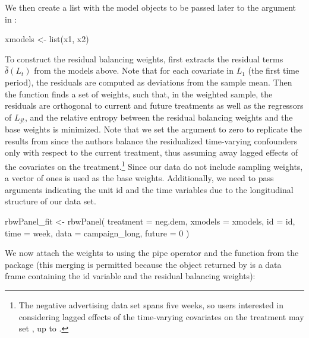 We then create a list with the model objects to be passed later to the
 argument in :

\begin{Schunk}
\begin{Sinput}
xmodels <- list(x1, x2)
\end{Sinput}
\end{Schunk}

To construct the residual balancing weights,  first
extracts the residual terms \(\hat{\delta}(L_{t})\) from the models
above. Note that for each covariate in \(L_{1}\) (the first time
period), the residuals are computed as deviations from the sample mean.
Then the function finds a set of weights, such that, in the weighted
sample, the residuals are orthogonal to current and future treatments as
well as the regressors of \(L_{jt}\), and the relative entropy between
the residual balancing weights and the base weights is minimized. Note
that we set the  argument to zero to replicate the results
from \citet{zhouResidualBalancingMethod2020a} since the authors balance
the residualized time-varying confounders only with respect to the
current treatment, thus assuming away lagged effects of the covariates
on the treatment.\footnote{The negative advertising data set spans five
  weeks, so users interested in considering lagged effects of the
  time-varying covariates on the treatment may set , up
  to .} Since our data do not include sampling weights,
a vector of ones is used as the base weights. Additionally, we need to
pass arguments indicating the unit id and the time variables due to the
longitudinal structure of our data set.

\begin{Schunk}
\begin{Sinput}
rbwPanel_fit <- rbwPanel(
  treatment = neg.dem,
  xmodels = xmodels,
  id = id,
  time = week,
  data = campaign_long,
  future = 0
)
\end{Sinput}
\end{Schunk}

We now attach the weights to  using the pipe
operator and the  function from the package
 (this merging is permitted because the 
object returned by  is a data frame containing the id
variable and the residual balancing weights):

\begin{Schunk}
\end{Schunk}

